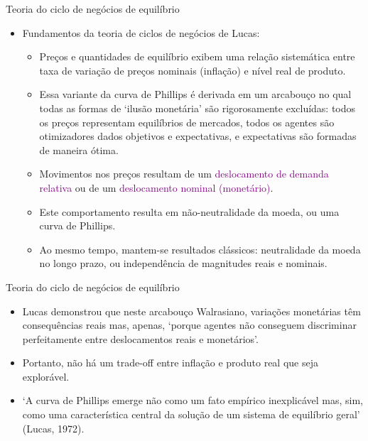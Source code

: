 \documentclass[10pt]{beamer}
\begin{document}
\begin{frame}{Teoria do ciclo de negócios de equilíbrio}
    \begin{itemize}
        \item Fundamentos da teoria de ciclos de negócios de Lucas:
        \bigskip
        \begin{itemize}
            \item Preços e quantidades de equilíbrio exibem uma relação sistemática entre taxa de variação de preços nominais (inflação) e nível real de produto.
            \bigskip
            \item Essa variante da curva de Phillips é derivada em um arcabouço no qual todas as formas de `ilusão monetária' são rigorosamente excluídas: todos os preços representam equilíbrios de mercados, todos os agentes são otimizadores dados objetivos e expectativas, e expectativas são formadas de maneira ótima.
            \bigskip
            \item Movimentos nos preços resultam de um \textcolor{purple}{deslocamento de demanda relativa} ou de um \textcolor{purple}{deslocamento nominal (monetário)}.
            \bigskip
            \item Este comportamento resulta em não-neutralidade da moeda, ou uma curva de Phillips.
            \bigskip
            \item Ao mesmo tempo, mantem-se resultados clássicos: neutralidade da moeda no longo prazo, ou independência de magnitudes reais e nominais.
        \end{itemize}
    \end{itemize}
\end{frame}

\begin{frame}{Teoria do ciclo de negócios de equilíbrio}
    \begin{itemize}
        \item Lucas demonstrou que neste arcabouço Walrasiano, variações monetárias têm consequências reais mas, apenas, `porque agentes não conseguem discriminar perfeitamente entre deslocamentos reais e monetários'.
        \bigskip
        \item Portanto, não há um trade-off entre inflação e produto real que seja explorável.
        \bigskip
        \item `A curva de Phillips emerge não como um fato empírico inexplicável mas, sim, como uma característica central da solução de um sistema de equilíbrio geral' (Lucas, 1972).
    \end{itemize}
\end{frame}
\end{document}
